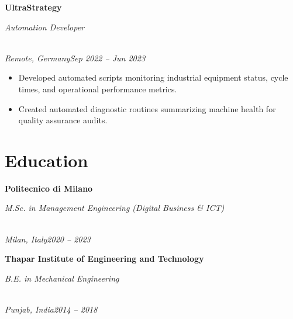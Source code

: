 \documentclass[a4paper,10pt]{article}
\newcommand{\role}[4]{\vspace{3pt}\noindent\hspace{0.6em}\parbox[t]{0.38\textwidth}{\raggedright\textbf{#1}}\hfill\parbox[t]{0.58\textwidth}{\raggedleft\textit{#2}}\\{\textit{#3}\hfill\textit{#4}}\vspace{1pt}}
\begin{document}
\role{UltraStrategy}{Automation Developer}{Remote, Germany}{Sep 2022 -- Jun 2023}
\begin{itemize}
\item Developed automated scripts monitoring industrial equipment status, cycle times, and operational performance metrics.
\item Created automated diagnostic routines summarizing machine health for quality assurance audits.
\end{itemize}

\section{Education}
\role{Politecnico di Milano}{M.Sc. in Management Engineering (Digital Business \& ICT)}{Milan, Italy}{2020 -- 2023}
\role{Thapar Institute of Engineering and Technology}{B.E. in Mechanical Engineering}{Punjab, India}{2014 -- 2018}
\end{document}
